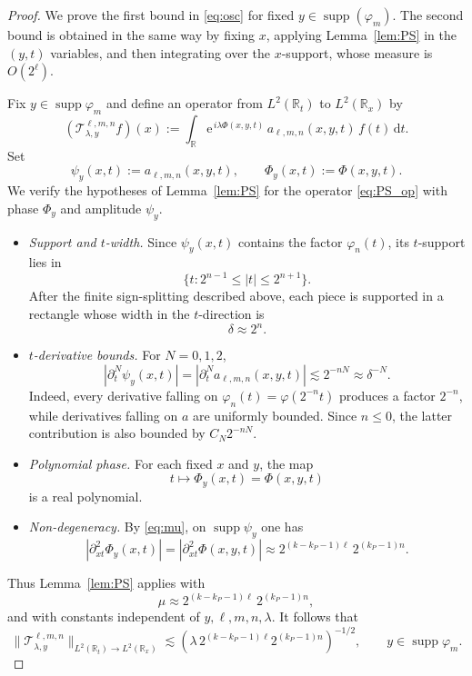 \documentclass[10pt]{amsart}
\numberwithin{equation}{section}
\theoremstyle{definition}
\theoremstyle{remark}
\theoremstyle{remark}
\newcommand{\R}{\mathbb{R}}
\newcommand{\e}{\mathrm{e}}
\newcommand{\supp}{\operatorname{supp}}
\begin{document}
	\begin{proof}
		We prove the first bound in \eqref{eq:osc} for fixed $y\in \supp(\varphi_m)$.  The second bound is obtained in the same way by fixing $x$, applying Lemma~\ref{lem:PS} in the $(y,t)$ variables, and then integrating over the $x$-support, whose measure is $O(2^\ell)$.
		
		Fix $y\in\supp\varphi_m$ and define an operator from $L^2(\R_t)$ to $L^2(\R_x)$ by
		\begin{equation}\label{eq:T_y_def}
			(\mathcal{T}_{\lambda,y}^{\ell,m,n}f)(x)
			:=
			\int_{\R}\e^{\,i\lambda\Phi(x,y,t)}\,a_{\ell,m,n}(x,y,t)\,f(t)\,\mathrm dt.
		\end{equation}
		Set
		\[
		\psi_y(x,t):=a_{\ell,m,n}(x,y,t),
		\qquad
		\Phi_y(x,t):=\Phi(x,y,t).
		\]
		We verify the hypotheses of Lemma~\ref{lem:PS} for the operator \eqref{eq:PS_op} with phase $\Phi_y$ and amplitude $\psi_y$.
		
		\begin{itemize}[leftmargin=2.2em]
			\item \emph{Support and $t$-width.}
			Since $\psi_y(x,t)$ contains the factor $\varphi_n(t)$, its $t$-support lies in
			\[
			\{t:2^{n-1}\le |t|\le 2^{n+1}\}.
			\]
			After the finite sign-splitting described above, each piece is supported in a rectangle whose width in the $t$-direction is
			\[
			\delta\approx 2^n.
			\]
			
			\item \emph{$t$-derivative bounds.}
			For $N=0,1,2$,
			\[
			|\partial_t^N\psi_y(x,t)|
			=
			|\partial_t^N a_{\ell,m,n}(x,y,t)|
			\lesssim 2^{-nN}
			\approx \delta^{-N}.
			\]
				Indeed, every derivative falling on $\varphi_n(t)=\varphi(2^{-n}t)$ produces a factor $2^{-n}$, while derivatives falling on $a$ are uniformly bounded.  Since $n\le0$, the latter contribution is also bounded by $C_N2^{-nN}$.
			
			
			\item \emph{Polynomial phase.}
			For each fixed $x$ and $y$, the map
			\[
			t\mapsto \Phi_y(x,t)=\Phi(x,y,t)
			\]
			is a real polynomial.
			
			\item \emph{Non-degeneracy.}
			By \eqref{eq:mu}, on $\supp\psi_y$ one has
			\[
			|\partial_{xt}^2 \Phi_y(x,t)|
			=
			|\partial_{xt}^2\Phi(x,y,t)|
			\approx
			2^{(k-k_P-1)\ell}\,2^{(k_P-1)n}.
			\]
		\end{itemize}
		Thus Lemma~\ref{lem:PS} applies with
		\[
		\mu
		\approx
		2^{(k-k_P-1)\ell}\,2^{(k_P-1)n},
		\]
		and with constants independent of $y,\ell,m,n,\lambda$.  It follows that
		\begin{equation}\label{eq:fixed_y_bound}
			\|\mathcal{T}_{\lambda,y}^{\ell,m,n}\|_{L^2(\R_t)\to L^2(\R_x)}
			\lesssim
			(\lambda\,2^{(k-k_P-1)\ell}2^{(k_P-1)n})^{-1/2},
			\qquad y\in\supp\varphi_m.
		\end{equation}
		

\end{proof}
\end{document}
